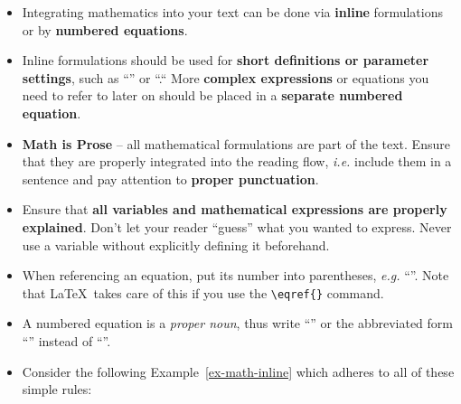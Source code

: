 \documentclass[11pt,a4paper]{article}
\begin{document}
\begin{itemize}
\item Integrating mathematics into your text can be done via \textbf{inline} formulations or by \textbf{numbered equations}.

\item  Inline formulations should be used for \textbf{short definitions or parameter settings}, such as ``'' or ``.``  More \textbf{complex expressions} or equations you need to refer to later on should be placed in a \textbf{separate numbered equation}.
  
\item \textbf{Math is Prose} -- all mathematical formulations are part of the text. Ensure that they are properly integrated into the reading flow, \emph{i.e.} include them in a sentence and pay attention to \textbf{proper punctuation}.

\item Ensure that \textbf{all variables and mathematical expressions are properly explained}. Don't let your reader ``guess'' what you wanted to express. Never use a variable without explicitly defining it beforehand.
  
\item When referencing an equation, put its number into parentheses, \emph{e.g.} ``''. Note that \LaTeX~takes care of this if you use the \verb,\eqref{}, command.  

\item A numbered equation is a \emph{proper noun}, thus write ``'' or the abbreviated form ``'' instead of ``''.

\item Consider the following Example~\ref{ex-math-inline} which adheres to all of these simple rules:

\end{itemize}
% 
\vspace{-0.5em}
\begin{texexample}
  \label{ex-math-inline}
  
  
\end{texexample}
\end{document}
